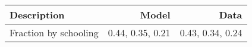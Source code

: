 \begin{tabular}{lrr}
\hline
Description & Model  & Data  \\ 
\hline
Fraction by schooling & 0.44, 0.35, 0.21  & 0.43, 0.34, 0.24  \\ 
\hline
\end{tabular}%

